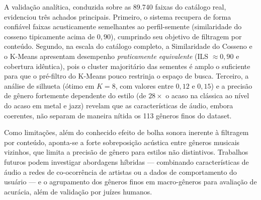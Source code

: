 \documentclass[12pt]{article}
\begin{document}
A validação analítica, conduzida sobre as 89.740 faixas do catálogo real, evidenciou três achados principais. Primeiro, o sistema recupera de forma confiável faixas acusticamente semelhantes ao perfil-semente (similaridade do cosseno tipicamente acima de $0,90$), cumprindo seu objetivo de filtragem por conteúdo. Segundo, na escala do catálogo completo, a Similaridade do Cosseno e o K-Means apresentam desempenho \textit{praticamente equivalente} (ILS $\approx 0,90$ e cobertura idêntica), pois o cluster majoritário das sementes é amplo o suficiente para que o pré-filtro do K-Means pouco restrinja o espaço de busca. Terceiro, a análise de silhueta (ótimo em $K=8$, com valores entre $0,12$ e $0,15$) e a precisão de gênero fortemente dependente do estilo (de $28\times$ o acaso na clássica ao nível do acaso em metal e jazz) revelam que as características de áudio, embora coerentes, não separam de maneira nítida os 113 gêneros finos do dataset.

Como limitações, além do conhecido efeito de bolha sonora inerente à filtragem por conteúdo, aponta-se a forte sobreposição acústica entre gêneros musicais vizinhos, que limita a precisão de gênero para estilos não distintivos. Trabalhos futuros podem investigar abordagens híbridas — combinando características de áudio a redes de co-ocorrência de artistas ou a dados de comportamento do usuário — e o agrupamento dos gêneros finos em macro-gêneros para avaliação de acurácia, além de validação por juízes humanos.



\end{document}
